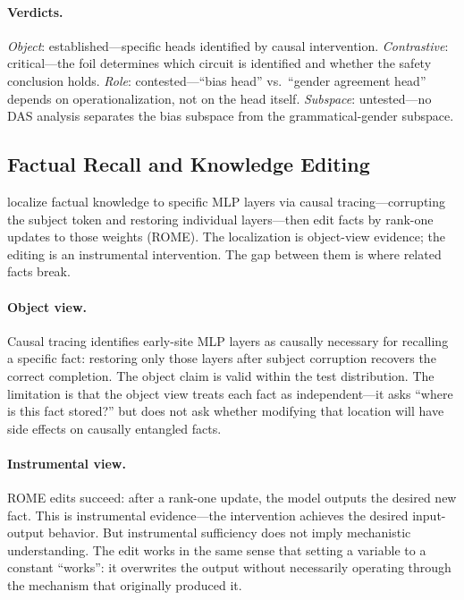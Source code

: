\documentclass{article}
\begin{document}
\paragraph{Verdicts.}
\emph{Object}: established---specific heads identified by causal
intervention.
\emph{Contrastive}: critical---the foil determines which circuit is
identified and whether the safety conclusion holds.
\emph{Role}: contested---``bias head'' vs.\ ``gender agreement head''
depends on operationalization, not on the head itself.
\emph{Subspace}: untested---no DAS analysis separates the bias subspace
from the grammatical-gender subspace.


\subsection{Factual Recall and Knowledge Editing}\label{app:cs_factual}

\citet{meng2022} localize factual knowledge to specific MLP layers via
causal tracing---corrupting the subject token and restoring individual
layers---then edit facts by rank-one updates to those weights (ROME).
The localization is object-view evidence; the editing is an instrumental
intervention. The gap between them is where related facts break.

\paragraph{Object view.}
Causal tracing identifies early-site MLP layers as causally necessary for
recalling a specific fact: restoring only those layers after subject
corruption recovers the correct completion. The object claim is valid
within the test distribution. The limitation is that the object view
treats each fact as independent---it asks ``where is this fact stored?''
but does not ask whether modifying that location will have side effects
on causally entangled facts.

\paragraph{Instrumental view.}
ROME edits succeed: after a rank-one update, the model outputs the
desired new fact. This is instrumental evidence---the intervention
achieves the desired input-output behavior. But instrumental sufficiency
does not imply mechanistic understanding. The edit works in the same
sense that setting a variable to a constant ``works'': it overwrites the
output without necessarily operating through the mechanism that
originally produced it.
\end{document}
